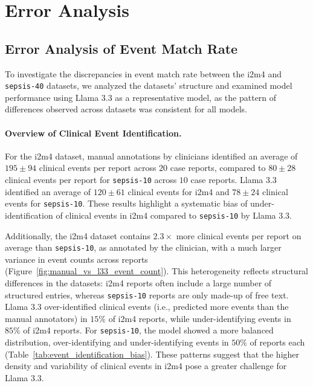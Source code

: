 \documentclass[pmlr,twocolumn,10pt]{jmlr} %
\begin{document}
\clearpage

\section{Error Analysis}\label{apd:error-analysis}

\subsection{Error Analysis of Event Match Rate}
To investigate the discrepancies in event match rate between the i2m4 and \texttt{sepsis-40} datasets, we analyzed the datasets' structure and examined model performance using Llama 3.3 as a representative model, as the pattern of differences observed across datasets was consistent for all models.

\paragraph{Overview of Clinical Event Identification.}
For the i2m4 dataset, manual annotations by clinicians identified an average of $195\pm94$ clinical events per report across $20$ case reports, compared to $80\pm28$ clinical events per report for \texttt{sepsis-10} across $10$ case reports. 
Llama 3.3 identified an average of $120\pm61$ clinical events for i2m4 and $78\pm24$ clinical events for \texttt{sepsis-10}. These results highlight a systematic bias of under-identification of clinical events in i2m4 compared to \texttt{sepsis-10} by Llama 3.3.

Additionally, the i2m4 dataset contains $2.3\times$ more clinical events per report on average than \texttt{sepsis-10}, as annotated by the clinician, with a much larger variance in event counts across reports (Figure~\ref{fig:manual_vs_l33_event_count}). 
This heterogeneity reflects structural differences in the datasets: i2m4 reports often include a large number of structured entries, whereas \texttt{sepsis-10} reports are only made-up of free text. 
Llama 3.3 over-identified clinical events (i.e., predicted more events than the manual annotators) in $15\%$ of i2m4 reports, while under-identifying events in $85\%$ of i2m4 reports. 
For \texttt{sepsis-10}, the model showed a more balanced distribution, over-identifying and under-identifying events in $50\%$ of reports each (Table~\ref{tab:event_identification_bias}). 
These patterns suggest that the higher density and variability of clinical events in i2m4 pose a greater challenge for Llama 3.3.
\end{document}
